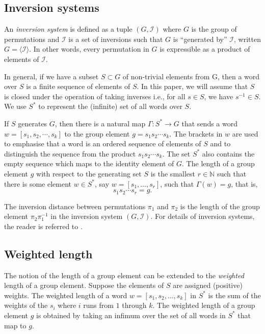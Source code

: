 \documentclass[utf8]{Frontiers_LaTex_Templates/frontiersFPHY} %
\newcommand{\invset}{\mathcal{I}}
\numberwithin{equation}{section}
\begin{document}
\subsection*{Inversion systems}

An \emph{inversion system} is defined as a tuple $(G, \invset)$ where $G$ is the group of permutations and $\invset$ is a set of inversions such that $G$ is ``generated by'' $\invset$, written $G = \langle \invset \rangle$. In other words, every permutation in $G$ is expressible as a product of elements of $\invset$. 

In general, if we have a subset $S \subset G$ of non-trivial elements from G, then a word over $S$ is a finite sequence of elements of $S$. In this paper, we will assume that $S$ is closed under the operation of taking inverses i.e., for all $s \in S$, we have $s^{-1} \in S$.  We use $S^*$ to represent the (infinite) set of all words over $S$. 

If $S$ generates $G$, then there is a natural map $\Gamma: S^* \rightarrow G$ that sends a word $w = [s_1, s_2,  \cdots ,s_k]$ to the group element $g = s_1 s_2 \cdots s_k$.
The brackets in $w$ are used to emphasise that a word is an ordered sequence of elements of $S$ and to distinguish the sequence from the product $s_1s_2 \cdots s_k$. The set $S^*$ also contains the empty sequence which maps to the identity element of $G$. The length of a group element $g$ with respect to the generating set $S$ is the smallest $r \in \mathbb{N}$ such that there is some element $w \in S^*$, say $w = [s_1, \hdots ,s_r]$, such that $\Gamma(w) = g$, that is, 
\[ s_1 s_2 \cdots s_r = g.\]


The inversion distance between permutations $\pi_1$ and $\pi_2$ is the length of the group element $\pi_2 \pi_1^{-1}$ in the inversion system $(G, \invset)$. For details of inversion systems, the reader is referred to \citet{egrinagy2013group}. 

\subsection*{Weighted length}
The notion of the length of a group element can be extended to the \emph{weighted} length of a group element. Suppose the elements of $S$ are assigned (positive) weights. The weighted length of a word $w = [s_1, s_2,  \dots ,s_k]$ in $S^*$ is the sum of the weights of the $s_i$ where $i$ runs from $1$ through $k$. The weighted length of a group element $g$ is obtained by taking an infimum over the set of all words in $S^*$ that map to $g$.
\end{document}
